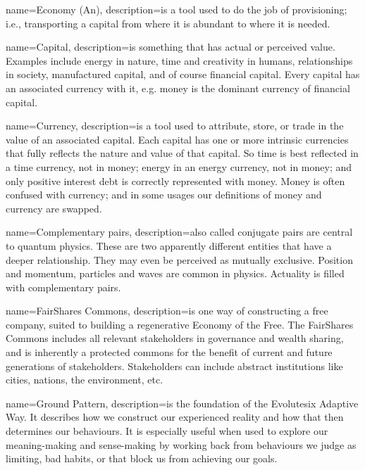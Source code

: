 {
  name=Economy (An),
  description={is a tool used to do the job of provisioning; i.e., transporting a capital from where it is abundant to where it is needed.}
}




{
  name=Capital,
  description={is something that has actual or perceived value. Examples include energy in nature, time and creativity in humans, relationships in society, manufactured capital, and of course financial capital. Every capital has an associated currency with it, e.g. money is the dominant currency of financial capital.}
}




{
  name=Currency,
  description={is a tool used to attribute, store, or trade in the value of an associated capital. Each capital has one or more intrinsic currencies that fully reflects the nature and value of that capital. So time is best reflected in a time currency, not in money; energy in an energy currency, not in money; and only positive interest debt is correctly represented with money. Money is often confused with currency; and in some usages our definitions of money and currency are swapped.}
}




{
  name=Complementary pairs,
  description={also called conjugate pairs are central to quantum physics. These are two apparently different entities that have a deeper relationship. They may even be perceived as mutually exclusive. Position and momentum, particles and waves are common in physics. Actuality is filled with complementary pairs. }
}




{
  name=FairShares Commons,
  description={is one way of constructing a free company, suited to building a regenerative Economy of the Free. The FairShares Commons includes all relevant stakeholders in governance and wealth sharing, and is inherently a protected commons for the benefit of current and future generations of stakeholders. Stakeholders can include abstract institutions like cities, nations, the environment, etc. }
}




{
  name=Ground Pattern,
  description={is the foundation of the Evolutesix Adaptive Way. It describes how we construct our experienced reality and how that then determines our behaviours. It is especially useful when used to explore our meaning-making and sense-making by working back from behaviours we judge as limiting, bad habits, or that block us from achieving our goals.}
}




